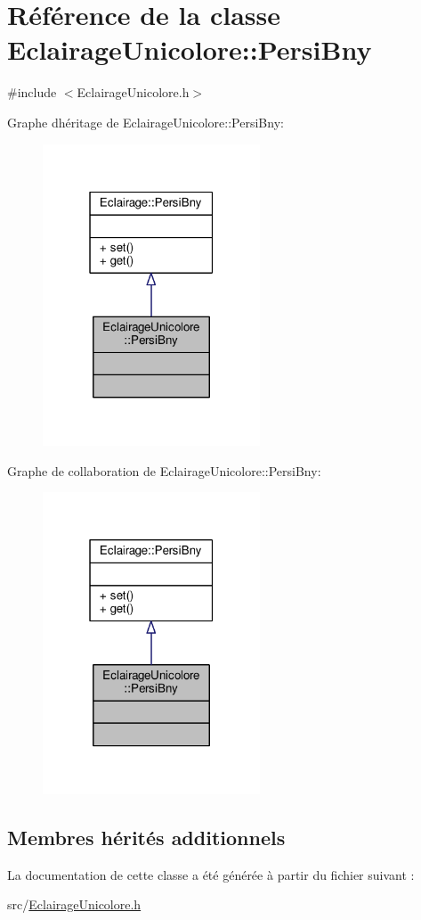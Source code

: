 \hypertarget{classEclairageUnicolore_1_1PersiBny}{}\section{Référence de la classe Eclairage\+Unicolore\+:\+:Persi\+Bny}
\label{classEclairageUnicolore_1_1PersiBny}


{\ttfamily \#include $<$Eclairage\+Unicolore.\+h$>$}



Graphe d\textquotesingle{}héritage de Eclairage\+Unicolore\+:\+:Persi\+Bny\+:\nopagebreak
\begin{figure}[H]
\begin{center}
\leavevmode
\includegraphics[width=183pt]{classEclairageUnicolore_1_1PersiBny__inherit__graph}
\end{center}
\end{figure}


Graphe de collaboration de Eclairage\+Unicolore\+:\+:Persi\+Bny\+:\nopagebreak
\begin{figure}[H]
\begin{center}
\leavevmode
\includegraphics[width=183pt]{classEclairageUnicolore_1_1PersiBny__coll__graph}
\end{center}
\end{figure}
\subsection*{Membres hérités additionnels}


La documentation de cette classe a été générée à partir du fichier suivant \+:\begin{DoxyCompactItemize}
\item 
src/\hyperlink{EclairageUnicolore_8h}{Eclairage\+Unicolore.\+h}\end{DoxyCompactItemize}
